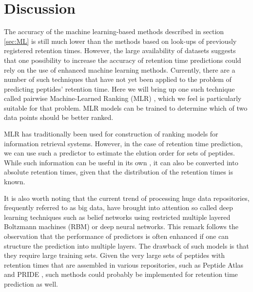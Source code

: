 \documentclass[a4paper]{article}
\begin{document}

\section{Discussion}

The accuracy of the machine learning-based methods described in
section \ref{sec:ML} is still much lower than the methods based on
look-ups of previously registered retention times. However, the large
availability of datasets suggests that one possibility to increase the
accuracy of retention time predictions could rely on the use of
enhanced machine learning methods. Currently, there are a number of
such techniques that have not yet been applied to the problem of
predicting peptides' retention time. Here we will bring up one such
technique called pairwise Machine-Learned Ranking (MLR)
\cite{liu2009learning}, which we feel is particularly suitable for
that problem. MLR models can be trained to determine which of two data
points should be better ranked. 

MLR has traditionally been used for construction of ranking models for
information retrieval systems. However, in the case of retention time
prediction, we can use such a predictor to estimate the elution order
for sets of peptides. While such information can be useful in its own
\cite{bailey2012instant}, it can also be converted into absolute
retention times, given that the distribution of the retention times is
known.

It is also worth noting that the current trend of processing huge data
repositories, frequently referred to as big data, have brought into
attention so called deep learning techniques such as belief networks
using restricted multiple layered Boltzmann machines (RBM)
\cite{salakhutdinov2009deep} or deep neural networks. This remark
follows the observation that the performance of predictors is often
enhanced if one can structure the prediction into multiple layers. The
drawback of such models is that they require large training
sets. Given the very large sets of peptides with retention times that
are assembled in various repositories, such as Peptide Atlas
\cite{desiere2006peptideatlas} and PRIDE \cite{martens2005pride}, such
methods could probably be implemented for retention time prediction as
well.
\end{document}
